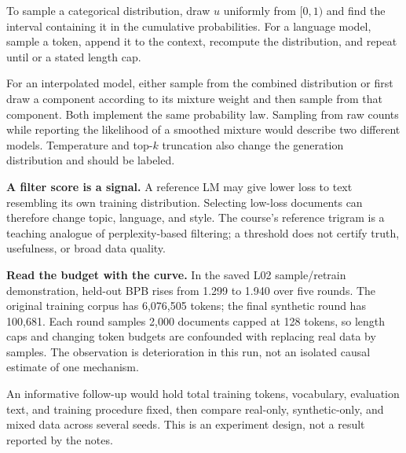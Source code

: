 
To sample a categorical distribution, draw $u$ uniformly from $[0,1)$ and
find the interval containing it in the cumulative probabilities. For a
language model, sample a token, append it to the context, recompute the
distribution, and repeat until \EOS{} or a stated length cap.


For an interpolated model, either sample from the combined distribution or
first draw a component according to its mixture weight and then sample
from that component. Both implement the same probability law. Sampling
from raw counts while reporting the likelihood of a smoothed mixture
would describe two different models. Temperature and top-$k$ truncation
also change the generation distribution and should be labeled.


\textbf{A filter score is a signal.} A reference LM may give lower loss to
text resembling its own training distribution. Selecting low-loss documents
can therefore change topic, language, and style. The course's reference
trigram is a teaching analogue of perplexity-based filtering; a threshold
does not certify truth, usefulness, or broad data quality.

\textbf{Read the budget with the curve.} In the saved L02 sample/retrain
demonstration, held-out BPB rises from 1.299 to 1.940 over five rounds.
The original training corpus has 6,076,505 tokens; the final synthetic
round has 100,681. Each round samples 2,000 documents capped at 128 tokens,
so length caps and changing token budgets are confounded with replacing
real data by samples. The observation is deterioration in this run, not
an isolated causal estimate of one mechanism.

An informative follow-up would hold total training tokens, vocabulary,
evaluation text, and training procedure fixed, then compare real-only,
synthetic-only, and mixed data across several seeds. This is an experiment
design, not a result reported by the notes.

